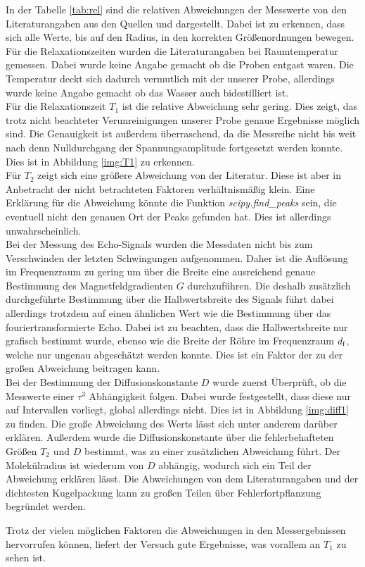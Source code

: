 \noindent
In der Tabelle \ref{tab:rel} sind die relativen Abweichungen der Messwerte von den Literaturangaben aus den Quellen \cite{theo} und \cite{radius} dargestellt.
Dabei ist zu erkennen, dass sich alle Werte, bis auf den Radius, in den korrekten Größenordnungen bewegen. 
Für die Relaxationszeiten wurden die Literaturangaben bei Raumtemperatur gemessen. Dabei wurde keine Angabe gemacht ob die Proben entgast waren.
Die Temperatur deckt sich dadurch vermutlich mit der unserer Probe, allerdings wurde keine Angabe gemacht ob das Wasser auch bidestilliert ist.\\
Für die Relaxationszeit $T_1$ ist die relative Abweichung sehr gering. 
Dies zeigt, das trotz nicht beachteter Verunreinigungen unserer Probe genaue Ergebnisse möglich sind. 
Die Genauigkeit ist außerdem überraschend, da die Messreihe nicht bis weit nach denn Nulldurchgang der Spannungsamplitude fortgesetzt werden konnte. 
Dies ist in Abbildung \ref{img:T1} zu erkennen.\\
Für $T_2$ zeigt sich eine größere Abweichung von der Literatur. Diese ist aber in Anbetracht der nicht betrachteten Faktoren verhältnismäßig klein.
Eine Erklärung für die Abweichung könnte die Funktion \textit{scipy.find\_peaks} sein, 
die eventuell nicht den genauen Ort der Peaks gefunden hat. Dies ist allerdings unwahrscheinlich.\\
Bei der Messung des Echo-Signals wurden die Messdaten nicht bis zum Verschwinden der letzten Schwingungen aufgenommen.
Daher ist die Auflösung im Frequenzraum zu gering um über die Breite eine ausreichend genaue Bestimmung des Magnetfeldgradienten $G$ durchzuführen.
Die deshalb zusätzlich durchgeführte Bestimmung über die Halbwertsbreite des Signals 
führt dabei allerdings trotzdem auf einen ähnlichen Wert wie die Bestimmung über das fouriertransformierte Echo.
Dabei ist zu beachten, dass die Halbwertsbreite nur grafisch bestimmt wurde, ebenso wie die Breite der Röhre im Frequenzraum $d_{\text{f}}$, 
welche nur ungenau abgeschätzt werden konnte.
Dies ist ein Faktor der zu der großen Abweichung beitragen kann.\\
Bei der Bestimmung der Diffusionskonstante $D$ wurde zuerst Überprüft, ob die Messwerte einer $\tau^3$ Abhängigkeit folgen.
Dabei wurde festgestellt, dass diese nur auf Intervallen vorliegt, global allerdings nicht.
Dies ist in Abbildung \ref{img:diff1} zu finden. 
Die große Abweichung des Werts lässt sich unter anderem darüber erklären. 
Außerdem wurde die Diffusionskonstante über die fehlerbehafteten Größen $T_2$ und $D$ bestimmt, was zu einer zusätzlichen Abweichung führt. 
Der Molekülradius ist wiederum von $D$ abhängig, wodurch sich ein Teil der Abweichung erklären lässt. 
Die Abweichungen von dem Literaturangaben und der dichtesten Kugelpackung kann zu großen Teilen über Fehlerfortpflanzung begründet werden.


\noindent
Trotz der vielen möglichen Faktoren die Abweichungen in den Messergebnissen hervorrufen können, liefert der Versuch gute Ergebnisse, was vorallem an $T_1$ zu sehen ist.
